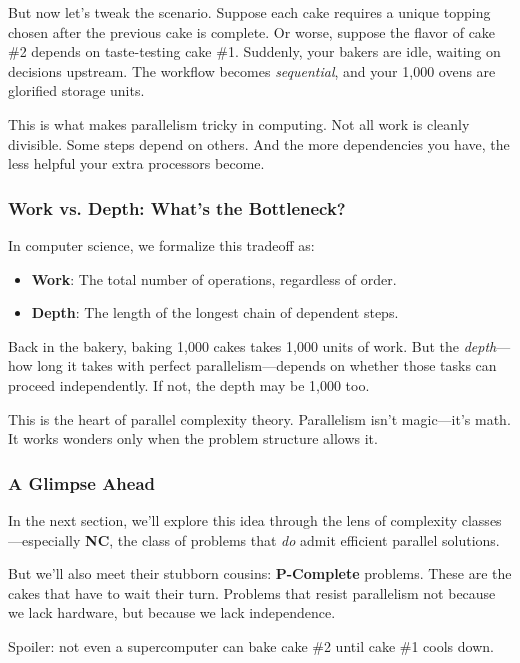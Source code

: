 But now let’s tweak the scenario. Suppose each cake requires a unique topping chosen after the previous cake is complete. Or worse, suppose the flavor of cake \#2 depends on taste-testing cake \#1. Suddenly, your bakers are idle, waiting on decisions upstream. The workflow becomes \textit{sequential}, and your 1,000 ovens are glorified storage units.

This is what makes parallelism tricky in computing. Not all work is cleanly divisible. Some steps depend on others. And the more dependencies you have, the less helpful your extra processors become.

\subsubsection{Work vs. Depth: What's the Bottleneck?}

In computer science, we formalize this tradeoff as:

\begin{itemize}
  \item \textbf{Work}: The total number of operations, regardless of order.
  \item \textbf{Depth}: The length of the longest chain of dependent steps.
\end{itemize}

Back in the bakery, baking 1,000 cakes takes 1,000 units of work. But the \textit{depth}—how long it takes with perfect parallelism—depends on whether those tasks can proceed independently. If not, the depth may be 1,000 too.

This is the heart of parallel complexity theory. Parallelism isn’t magic—it’s math. It works wonders only when the problem structure allows it.

\subsubsection{A Glimpse Ahead}

In the next section, we’ll explore this idea through the lens of complexity classes—especially \textbf{NC}, the class of problems that \textit{do} admit efficient parallel solutions.

But we’ll also meet their stubborn cousins: \textbf{P-Complete} problems. These are the cakes that have to wait their turn. Problems that resist parallelism not because we lack hardware, but because we lack independence.

Spoiler: not even a supercomputer can bake cake \#2 until cake \#1 cools down.




